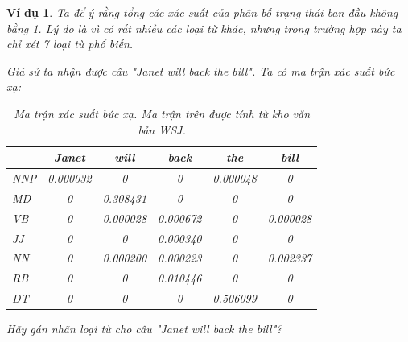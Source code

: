 \documentclass[14pt, a4paper]{article}
\numberwithin{equation}{section}
\numberwithin{figure}{section}
\theoremstyle{sltheorem}
\newtheorem{vd}{Ví dụ}
\theoremstyle{soltheorem}
\numberwithin{dl}{section}
\numberwithin{md}{section}
\numberwithin{vd}{section}
\begin{document}
\begin{vd}
        Ta để ý rằng tổng các xác suất của phân bố trạng thái ban đầu không bằng 1.
        Lý do là vì có rất nhiều các loại từ khác, nhưng trong trường hợp này ta chỉ xét 7 loại từ phổ biến.

        Giả sử ta nhận được câu "Janet will back the bill". Ta có ma trận xác suất bức xạ:

        \begin{table}[h!]
            \begin{center}
                \begin{tabular}{ | l | c | c | c | c | c |}
                    \hline
                    & Janet & will & back & the & bill \\
                    \hline
                    NNP & 0.000032 & 0 & 0 & 0.000048 & 0 \\
                    \hline
                    MD & 0 & 0.308431 & 0 & 0 & 0 \\
                    \hline
                    VB & 0 & 0.000028 & 0.000672 & 0 & 0.000028 \\
                    \hline
                    JJ & 0 & 0 & 0.000340 & 0 & 0 \\
                    \hline
                    NN & 0 & 0.000200 & 0.000223 & 0 & 0.002337 \\
                    \hline
                    RB & 0 & 0 & 0.010446 & 0 & 0 \\
                    \hline
                    DT & 0 & 0 & 0 & 0.506099 & 0 \\
                    \hline
                \end{tabular}
            \end{center}
            \caption{Ma trận xác suất bức xạ. Ma trận trên được tính từ kho văn bản WSJ.}
        \end{table}

        Hãy gán nhãn loại từ cho câu "Janet will back the bill"?
    \end{vd}
\end{document}
